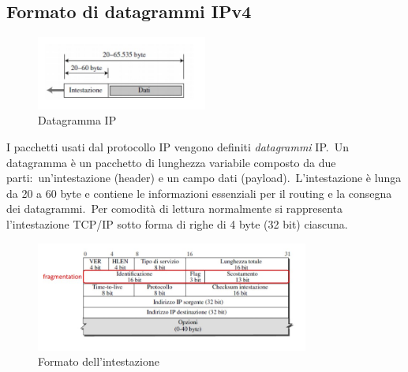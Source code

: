 \subsection{Formato di datagrammi IPv4}

\begin{figure}[H]
    \centering
    \includegraphics[width=0.5\textwidth]{immagini/Datagramma.jpg}
    \caption*{Datagramma IP}
\end{figure}

I pacchetti usati dal protocollo IP vengono definiti \emph{datagrammi} IP.\
Un datagramma è un pacchetto di lunghezza variabile composto da due parti:\ un'intestazione (header) e un campo dati (payload).\
L'intestazione è lunga da 20 a 60 byte e contiene le informazioni essenziali per il routing e la consegna dei datagrammi.\
Per comodità di lettura normalmente si rappresenta l'intestazione TCP/IP sotto forma di righe di 4 byte (32 bit) ciascuna.

\begin{figure}[H]
    \centering
    \includegraphics[width = 0.8\textwidth]{immagini/Intestazione_datagramma.jpg}
    \caption*{Formato dell'intestazione}
\end{figure}

